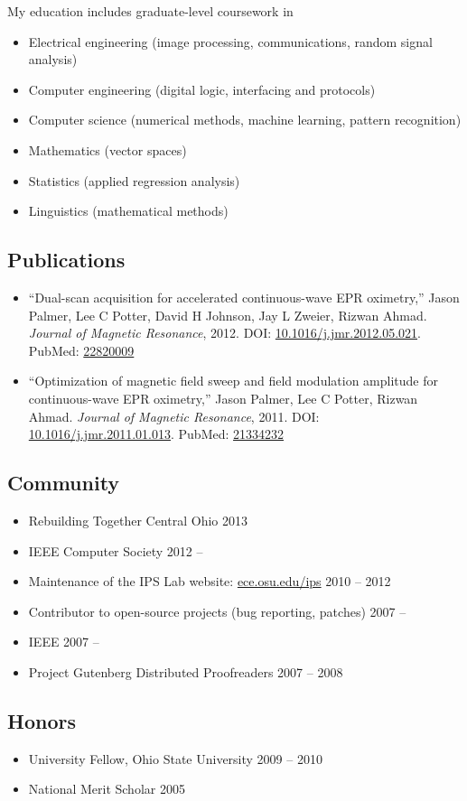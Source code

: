 \documentclass[12pt]{report}
\begin{document}
My education includes graduate-level coursework in
\begin{itemize}
\item Electrical engineering (image processing, communications, random signal analysis)
\item Computer engineering (digital logic, interfacing and protocols)
\item Computer science (numerical methods, machine learning, pattern recognition)
\item Mathematics (vector spaces)
\item Statistics (applied regression analysis)
\item Linguistics (mathematical methods)
\end{itemize}

\subsection*{Publications}
\begin{itemize}
\item ``Dual-scan acquisition for accelerated continuous-wave EPR oximetry,''
Jason Palmer, Lee C Potter, David H Johnson, Jay L Zweier, Rizwan Ahmad.
{\it Journal of Magnetic Resonance}, 2012.
DOI: \href{http://dx.doi.org/10.1016/j.jmr.2012.05.021}{10.1016/j.jmr.2012.05.021}.
PubMed: \href{http://www.ncbi.nlm.nih.gov/pubmed/22820009}{22820009}
\item ``Optimization of magnetic field sweep and field modulation amplitude for continuous-wave EPR oximetry,''
Jason Palmer, Lee C Potter, Rizwan Ahmad.
{\it Journal of Magnetic Resonance}, 2011.
DOI: \href{http://dx.doi.org/10.1016/j.jmr.2011.01.013}{10.1016/j.jmr.2011.01.013}.
PubMed: \href{http://www.ncbi.nlm.nih.gov/pubmed/21334232}{21334232}
\end{itemize}

\subsection*{Community}
\begin{itemize}
\item Rebuilding Together Central Ohio                                                   \hfill 2013
\item IEEE Computer Society                                                              \hfill 2012 -- ~~~~~~~
\item Maintenance of the IPS Lab website: \href{http://ece.osu.edu/ips}{ece.osu.edu/ips} \hfill 2010 -- 2012
\item Contributor to open-source projects (bug reporting, patches)                       \hfill 2007 -- ~~~~~~~
\item IEEE                                                                               \hfill 2007 -- ~~~~~~~
\item Project Gutenberg Distributed Proofreaders                                         \hfill 2007 -- 2008
\end{itemize}

\subsection*{Honors}
\begin{itemize}
\item University Fellow, Ohio State University \hfill 2009 -- 2010
\item National Merit Scholar                   \hfill 2005
\end{itemize}
\end{document}
